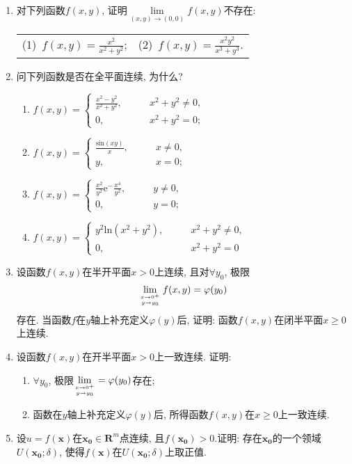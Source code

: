 \begin{enumerate}
\item 对下列函数$f(x,y)$, 证明$\lim\limits_{(x,y)\rightarrow (0,0)}f(x,y)$不存在:
\begin{table}[H]
	\begin{tabular}{ll}
		(1)\ $f(x,y)=\frac{x^2}{x^2+y^2}$;\qquad \qquad \qquad \qquad \qquad &(2)\ $f(x,y)=\frac{x^2y^2}{x^3+y^3}$.
	\end{tabular}
\end{table}
\item 问下列函数是否在全平面连续, 为什么?
\begin{enumerate}
	\item $f(x,y)=\begin{cases}
	\frac{x^2-y^2}{x^2+y^2},\qquad&x^2+y^2 \ne 0,\\
	0,\qquad& x^2+y^2 = 0;
	\end{cases}$
	\item $f(x,y)=\begin{cases}
	\frac{\mathrm{sin}(xy)}{x},\qquad &x\ne 0,\\
	y,\qquad &x=0;
	\end{cases}$
	\item $f(x,y)=\begin{cases}
	\frac{x^2}{y^2}\mathrm{e}^-\frac{x^4}{y^2},\qquad& y\ne 0,\\
	0,\qquad& y=0;
	\end{cases}$
	\item $f(x,y)=\begin{cases}
	y^2\mathrm{ln}(x^2+y^2),\qquad& x^2+y^2\ne 0,\\
	0,\qquad& x^2+y^2=0
	\end{cases}$
\end{enumerate}
\item 设函数$f(x,y)$在半开平面$x>0$上连续, 且对$\forall y_0$, 极限
$$\lim\limits_{x\rightarrow 0^+ \atop y\rightarrow y_0}f(x,y) = \varphi(y_0)$$
存在. 当函数$f$在$y$轴上补充定义$\varphi(y)$后, 证明: 函数$f(x,y)$在闭半平面$x\ge 0$上连续.
\item 设函数$f(x,y)$在开半平面$x>0$上一致连续. 证明:
\begin{enumerate}
	\item $\forall y_0$, 极限$\lim\limits_{x \rightarrow 0^+ \atop y \rightarrow y_0}=\varphi(y_0)$存在;
	\item 函数在$y$轴上补充定义$\varphi (y)$后, 所得函数$f(x,y)$在$x\ge 0$上一致连续. 
\end{enumerate}
\item 设$u=f(\bm{x})$在$\bm{x_0}\in \bm{R}^m$点连续, 且$f(\bm{x_0})>0$.证明: 存在$\bm{x_0}$的一个领域$U(\bm{x_0};\delta)$, 使得$f(\bm{x})$在$U(\bm{x_0};\delta)$上取正值.

\end{enumerate}
